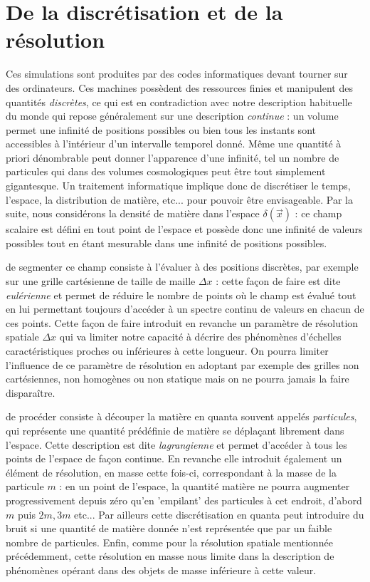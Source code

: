 \section{De la discrétisation et de la résolution}
Ces simulations sont produites par des codes informatiques devant tourner sur des ordinateurs. Ces machines possèdent des ressources finies et manipulent des quantités \textit{discrètes}, ce qui est en contradiction avec notre description habituelle du monde qui repose généralement sur une description \textit{continue} : un volume permet une infinité de positions possibles ou bien tous les instants sont accessibles à l'intérieur d'un intervalle temporel donné. Même une quantité à priori dénombrable peut donner l'apparence d'une infinité, tel un nombre de particules qui dans des volumes cosmologiques peut être tout simplement gigantesque. Un traitement informatique implique donc de discrétiser le temps, l'espace, la distribution de matière, etc... pour pouvoir être envisageable.
Par la suite, nous considérons la densité de matière dans l'espace $\delta(\vec x)$ : ce champ scalaire est défini en tout point de l'espace et possède donc une infinité de valeurs possibles tout en étant mesurable dans une infinité de positions possibles. 

 de segmenter ce champ consiste à l'évaluer à des positions discrètes, par exemple sur une grille cartésienne de taille de maille $\Delta x$ : cette façon de faire est dite \textit{eulérienne} et permet de réduire le nombre de points où le champ est évalué tout en lui permettant toujours d'accéder à un spectre continu de valeurs en chacun de ces points. Cette façon de faire introduit en revanche un paramètre de résolution spatiale $\Delta x$ qui va limiter notre capacité à décrire des phénomènes d'échelles caractéristiques proches ou inférieures à cette longueur. On pourra limiter l'influence de ce paramètre de résolution en adoptant par exemple des grilles non cartésiennes, non homogènes ou non statique mais on ne pourra jamais la faire disparaître.

 de procéder consiste à découper la matière en quanta souvent appelés \textit{particules}, qui représente une quantité prédéfinie de matière se déplaçant librement dans l'espace. Cette description est dite \textit{lagrangienne} et permet d'accéder à tous les points de l'espace de façon continue. En revanche elle introduit également un élément de résolution, en masse cette fois-ci, correspondant à la masse de la particule $m$ : en un point de l'espace, la quantité matière ne pourra augmenter progressivement depuis zéro qu'en 'empilant' des particules à cet endroit, d'abord $m$ puis $2m,3m$ etc... Par ailleurs cette discrétisation en quanta peut introduire du bruit si une quantité de matière donnée n'est représentée que par un faible nombre de particules. Enfin, comme pour la résolution spatiale mentionnée précédemment, cette résolution en masse nous limite dans la description de phénomènes opérant dans des objets de masse inférieure à cette valeur.

